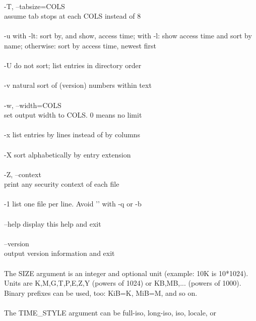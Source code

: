 \documentclass{article}
\begin{document}
\\
\tabto{1cm}       -T, --tabsize=COLS \\
\tabto{2cm}              assume tab stops at each COLS instead of 8 \\
\\
\tabto{1cm}       -u     with  -lt:  sort by, and show, access time; with -l: show access
\tabto{2cm}              time and sort by name; otherwise: sort by  access  time,  newest
\tabto{2cm}              first \\
\\
\tabto{1cm}       -U     do not sort; list entries in directory order \\
\\
\tabto{1cm}       -v     natural sort of (version) numbers within text \\
\\
\tabto{1cm}       -w, --width=COLS \\
\tabto{2cm}              set output width to COLS.  0 means no limit \\
\\
\tabto{1cm}       -x     list entries by lines instead of by columns \\
\\
\tabto{1cm}       -X     sort alphabetically by entry extension \\
\\
\tabto{1cm}       -Z, --context \\
\tabto{2cm}              print any security context of each file \\
\\
\tabto{1cm}       -1     list one file per line.  Avoid '\n' with -q or -b \\
\\
\tabto{1cm}       --help display this help and exit \\
\\
\tabto{1cm}       --version \\
\tabto{2cm}              output version information and exit \\
\\
\tabto{1cm}       The  SIZE  argument  is  an  integer and optional unit (example: 10K is
\tabto{1cm}       10*1024).  Units are K,M,G,T,P,E,Z,Y  (powers  of  1024)  or  KB,MB,...
\tabto{1cm}       (powers  of 1000).  Binary prefixes can be used, too: KiB=K, MiB=M, and
\tabto{1cm}       so on. \\
\\
\tabto{1cm}       The TIME_STYLE argument can be  full-iso,  long-iso,  iso,  locale,  or
\end{document}
